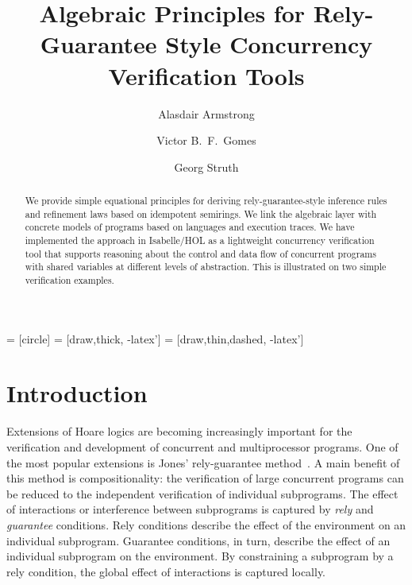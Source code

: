 \documentclass{llncs}
\begin{document}
 = [circle]
 = [draw,thick, -latex']
 = [draw,thin,dashed, -latex']

\title{Algebraic Principles for Rely-Guarantee Style Concurrency Verification Tools}

\author{Alasdair Armstrong \and Victor B.~F.~Gomes \and Georg Struth}


\maketitle

\begin{abstract}
  We provide simple equational principles for deriving
  rely-guarantee-style inference rules and refinement laws based on
  idempotent semirings. We link the algebraic layer with concrete
  models of programs based on languages and execution traces. We have
  implemented the approach in Isabelle/HOL as a lightweight
  concurrency verification tool that supports reasoning about the
  control and data flow of concurrent programs with shared variables
  at different levels of abstraction. This is illustrated on two
  simple verification examples.
\end{abstract}

\pagestyle{plain}

\section{Introduction}

Extensions of Hoare logics are becoming increasingly important for the
verification and development of concurrent and multiprocessor
programs. One of the most popular extensions is Jones' rely-guarantee
method~\cite{jones_development_1981}.  A main benefit of this method is
compositionality: the verification of large concurrent programs can be
reduced to the independent verification of individual subprograms. The
effect of interactions or interference between subprograms is captured
by \emph{rely} and \emph{guarantee} conditions. Rely conditions describe
the effect of the environment on an individual subprogram. Guarantee conditions,
in turn, describe the effect of an individual subprogram on the
environment. By constraining a subprogram by a rely condition, the global
effect of interactions is captured locally.
\end{document}
